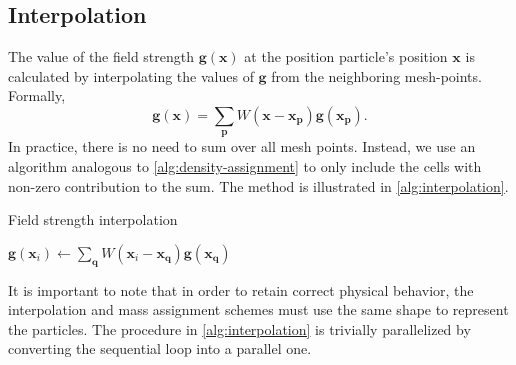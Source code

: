 \subsection{Interpolation}
The value of the field strength $\mathbf{g}(\mathbf{x})$ at the position particle's position $\mathbf{x}$ is calculated by interpolating the values of $\mathbf{g}$ from the neighboring mesh-points.
Formally,
\begin{equation*}
    \mathbf{g}(\mathbf{x}) = \sum_\mathbf{p} W(\mathbf{x} - \mathbf{x}_\mathbf{p}) \mathbf{g}(\mathbf{x}_\mathbf{p}).
\end{equation*}
In practice, there is no need to sum over all mesh points.
Instead, we use an algorithm analogous to \autoref{alg:density-assignment} to only include the cells with non-zero contribution to the sum.
The method is illustrated in \autoref{alg:interpolation}.
\begin{algorithm}
    \caption{Field strength interpolation}\label{alg:interpolation}
    \begin{algorithmic}
        \State $\mathbf{g}(\mathbf{x}_i) \gets \sum_\mathbf{q} W(\mathbf{x}_i - \mathbf{x}_\mathbf{q}) \mathbf{g}(\mathbf{x}_\mathbf{q})$
        \EndFor
        \EndFor
    \end{algorithmic}
\end{algorithm}
It is important to note that in order to retain correct physical behavior, the interpolation and mass assignment schemes must use the same shape to represent the particles.
The procedure in \autoref{alg:interpolation} is trivially parallelized by converting the sequential loop into a parallel one.